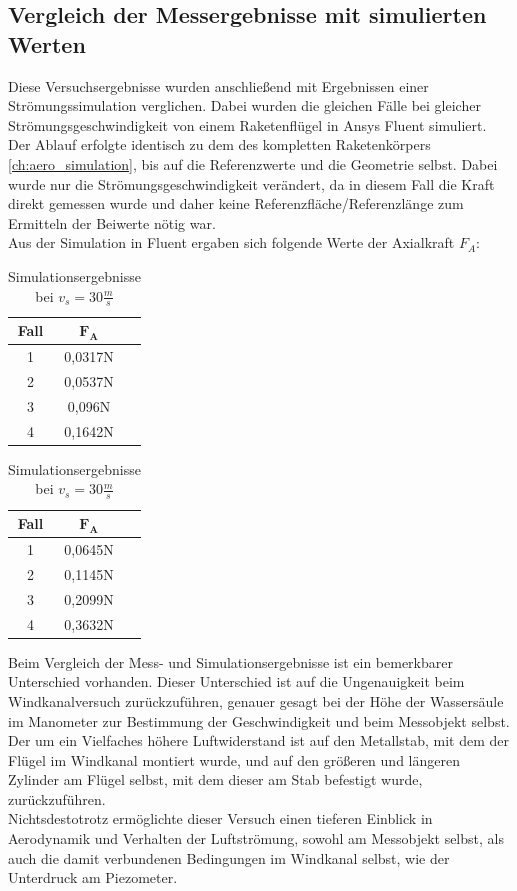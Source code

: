 \subsection{Vergleich der Messergebnisse mit simulierten Werten}
\label{subsec:wind_tunnel_sim_comparison}
Diese Versuchsergebnisse wurden anschließend mit Ergebnissen einer Strömungssimulation verglichen. Dabei wurden die gleichen Fälle bei gleicher Strömungsgeschwindigkeit von einem Raketenflügel in Ansys Fluent simuliert. Der Ablauf erfolgte identisch zu dem des kompletten Raketenkörpers \ref{ch:aero_simulation}, bis auf die Referenzwerte und die Geometrie selbst. Dabei wurde nur die Strömungsgeschwindigkeit verändert, da in diesem Fall die Kraft direkt gemessen wurde und daher keine Referenzfläche/Referenzlänge zum Ermitteln der Beiwerte nötig war.
\\
Aus der Simulation in Fluent ergaben sich folgende Werte der Axialkraft $F_A$:
\begin{table}[H]
\centering
\begin{minipage}{0.49\textwidth}
    \centering
    \begin{tabular}{|c|c|c|}
\hline
\textbf{Fall} & $\mathbf{F_A}$ \\
\hline
1 & 0,0317N \\
2 & 0,0537N \\
3 & 0,096N \\
4 & 0,1642N \\
\hline
    \end{tabular}
    \caption {Simulationsergebnisse bei $v_s = 20\frac{m}{s}$}
    \label{tab:sim_results_20ms}
    \end{minipage}
    \hfill
    \begin{minipage}{0.49\textwidth}
    \centering
    \begin{tabular}{|c|c|c|}
\hline
\textbf{Fall} & $\mathbf{F_A}$ \\
\hline
1 & 0,0645N \\
2 & 0,1145N \\
3 & 0,2099N \\
4 & 0,3632N \\
\hline
    \end{tabular}
    \caption{Simulationsergebnisse bei $v_s = 30\frac{m}{s}$}
    \label{tab:sim_results_30ms}
    \end{minipage}
\end{table}
Beim Vergleich der Mess- und Simulationsergebnisse ist ein bemerkbarer Unterschied vorhanden. Dieser Unterschied ist auf die Ungenauigkeit beim Windkanalversuch zurückzuführen, genauer gesagt bei der Höhe der Wassersäule im Manometer zur Bestimmung der Geschwindigkeit und beim Messobjekt selbst. Der um ein Vielfaches höhere Luftwiderstand ist auf den Metallstab, mit dem der Flügel im Windkanal montiert wurde, und auf den größeren und längeren Zylinder am Flügel selbst, mit dem dieser am Stab befestigt wurde, zurückzuführen.
\\
Nichtsdestotrotz ermöglichte dieser Versuch einen tieferen Einblick in Aerodynamik und Verhalten der Luftströmung, sowohl am Messobjekt selbst, als auch die damit verbundenen Bedingungen im Windkanal selbst, wie der Unterdruck am Piezometer.

